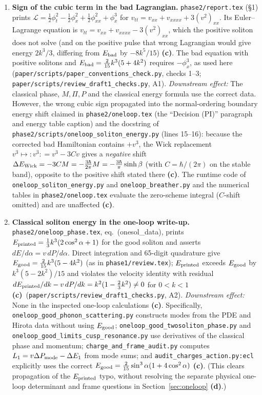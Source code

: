 \documentclass[11pt,a4paper]{article}
\newcommand{\lab}[1]{{\normalfont\sffamily\footnotesize\bfseries(#1)}}
\newcommand{\Lc}{\lab{c}}
\newcommand{\Ld}{\lab{d}}
\newcommand{\scr}[1]{\nolinkurl{#1}}
\newcommand{\hb}{\hbar}
\theoremstyle{remark}
\begin{document}
\begin{enumerate}
\item \textbf{Sign of the cubic term in the bad Lagrangian.} \scr{phase2/report.tex} (\S1) prints $\mathcal L=\tfrac12\phi_t^2-\tfrac12\phi_x^2+\tfrac12\phi_{xx}^2+\phi_x^3$ for $v_{tt}=v_{xx}+v_{xxxx}+3(v^2)_{xx}$. Its Euler--Lagrange equation is $v_{tt}=v_{xx}+v_{xxxx}-3(v^2)_{xx}$, which the positive soliton does not solve (and on the positive pulse that wrong Lagrangian would give energy $2k^3/3$, differing from $E_{\rm bad}$ by $-8k^5/15$) \Lc. The bad equation with positive solitons and $E_{\rm bad}=\tfrac2{15}k^3(5+4k^2)$ requires $-\phi_x^3$, as used here (\scr{paper/scripts/paper_conventions_check.py}, checks 1--3; \scr{paper/scripts/review_draft1_checks.py}, A1). \emph{Downstream effect:} The classical phase, $M,\Pi,P$ and the classical energy formula use the correct data. However, the wrong cubic sign propagated into the normal-ordering boundary energy shift claimed in \scr{phase2/oneloop.tex} (the ``Decision (PI)'' paragraph and energy table caption) and the docstring of \scr{phase2/scripts/oneloop_soliton_energy.py} (lines 15--16): because the corrected bad Hamiltonian contains $+v^3$, the Wick replacement $v^3\mapsto{:v^3:}=v^3-3Cv$ gives a \emph{negative} shift $\Delta E_{\rm Wick}=-3CM=-\frac{3\hb}{2\pi}M=-\frac{3\hb}{\pi}\sinh\beta$ (with $C=\hb/(2\pi)$ on the stable band), opposite to the positive shift stated there \Lc. The runtime code of \scr{oneloop_soliton_energy.py} and \scr{oneloop_breather.py} and the numerical tables in \scr{phase2/oneloop.tex} evaluate the zero-scheme integral ($C$-shift omitted) and are unaffected \Lc.
\item \textbf{Classical soliton energy in the one-loop write-up.} \scr{phase2/oneloop_phase.tex}, eq.~(onesol\_data), prints $E_{\rm printed}=\tfrac13k^3(2\cos^2\alpha+1)$ for the good soliton and asserts $dE/d\alpha=v\,dP/d\alpha$. Direct integration and 65-digit quadrature give $E_{\rm good}=\tfrac2{15}k^3(5-4k^2)$ (as in \scr{phase1/review.tex}); $E_{\rm printed}$ exceeds $E_{\rm good}$ by $k^3(5-2k^2)/15$ and violates the velocity identity with residual $dE_{\rm printed}/dk-v\,dP/dk=k^2(1-\tfrac23k^2)\neq0$ for $0<k<1$ \Lc\ (\scr{paper/scripts/review_draft1_checks.py}, A2). \emph{Downstream effect:} None in the inspected one-loop calculations \Lc. Specifically, \scr{oneloop_good_phonon_scattering.py} constructs modes from the PDE and Hirota data without using $E_{\rm good}$; \scr{oneloop_good_twosoliton_phase.py} and \scr{oneloop_good_limits_cusp_resonance.py} use derivatives of the classical phase and momentum; \scr{charge_and_frame_audit.py} computes $L_1=v\Delta P_{\rm mode}-\Delta E_1$ from mode sums; and \scr{audit_charges_action.py:ecl} explicitly uses the correct $E_{\rm good}=\tfrac2{15}\sin^3\alpha(1+4\cos^2\alpha)$ \Lc. (This clears propagation of the $E_{\rm printed}$ typo, without resolving the separate physical one-loop determinant and frame questions in Section~\ref{sec:oneloop} \Ld.)

\end{enumerate}
\end{document}
